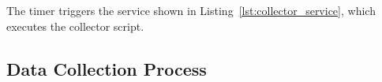 \documentclass[conference]{IEEEtran}
\begin{document}






The timer triggers the service shown in Listing~\ref{lst:collector_service}, which executes the collector script.






\subsection{ Data Collection Process }

\end{document}
